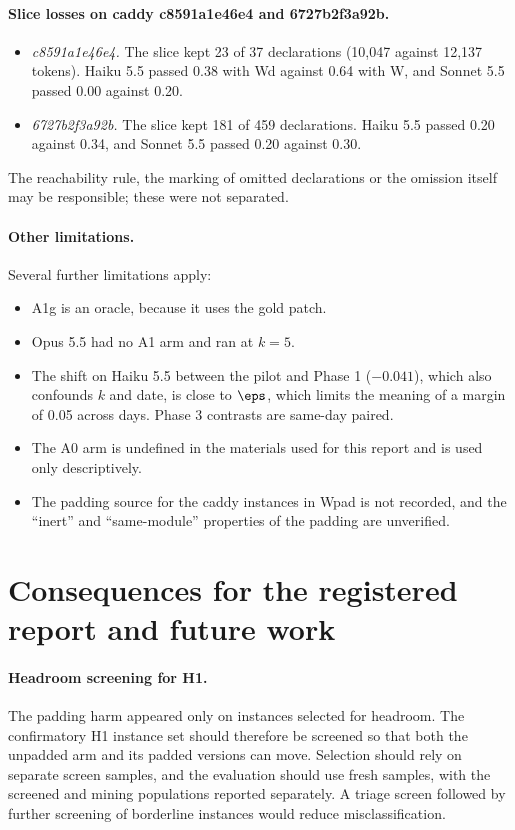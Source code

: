 \paragraph{Slice losses on caddy c8591a1e46e4 and 6727b2f3a92b.}
\begin{itemize}
\item \emph{c8591a1e46e4.} The slice kept 23 of 37 declarations (10,047 against 12,137 tokens). Haiku 5.5 passed 0.38 with Wd against 0.64 with W, and Sonnet 5.5 passed 0.00 against 0.20.
\item \emph{6727b2f3a92b.} The slice kept 181 of 459 declarations. Haiku 5.5 passed 0.20 against 0.34, and Sonnet 5.5 passed 0.20 against 0.30.
\end{itemize}
The reachability rule, the marking of omitted declarations or the omission itself may be responsible; these were not separated.

\paragraph{Other limitations.} Several further limitations apply:
\begin{itemize}
\item A1g is an oracle, because it uses the gold patch.
\item Opus 5.5 had no A1 arm and ran at $k=5$.
\item The shift on Haiku 5.5 between the pilot and Phase 1 ($-0.041$), which also confounds $k$ and date, is close to $\eps$, which limits the meaning of a margin of 0.05 across days. Phase 3 contrasts are same-day paired.
\item The A0 arm is undefined in the materials used for this report and is used only descriptively.
\item The padding source for the caddy instances in Wpad is not recorded, and the ``inert'' and ``same-module'' properties of the padding are unverified.
\end{itemize}

\section{Consequences for the registered report and future work}

\paragraph{Headroom screening for H1.} The padding harm appeared only on instances selected for headroom. The confirmatory H1 instance set should therefore be screened so that both the unpadded arm and its padded versions can move. Selection should rely on separate screen samples, and the evaluation should use fresh samples, with the screened and mining populations reported separately. A triage screen followed by further screening of borderline instances would reduce misclassification.

